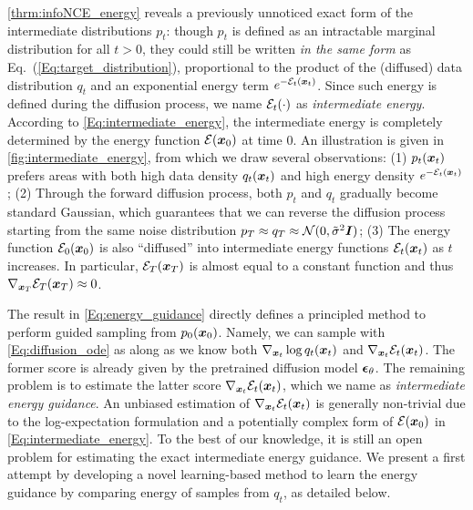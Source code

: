 \cref{thrm:infoNCE_energy} reveals a previously unnoticed exact form of the intermediate distributions $p_t$: though $p_t$ is defined as an intractable marginal distribution for all $t>0$, they could still be written \emph{in the same form} as  Eq.~(\ref{Eq:target_distribution}), proportional to the product of the (diffused) data distribution $q_t$ and an exponential energy term $e^{-{\mathcal{E}}_t({\bm{x}}_t)}$.
Since such energy is defined during the diffusion process, we name ${\mathcal{E}}_t(\cdot)$ as \textit{intermediate energy}.
According to \eqref{Eq:intermediate_energy}, the intermediate energy is completely determined by the energy function ${\mathcal{E}}({\bm{x}}_0)$ at time $0$.
An illustration is given in \cref{fig:intermediate_energy}, from which we draw several observations: (1) $p_t({\bm{x}}_t)$ prefers areas with both high data density $q_t({\bm{x}}_t)$ and high energy density $e^{-{\mathcal{E}}_t({\bm{x}}_t)}$; (2) Through the forward diffusion process, both $p_t$ and $q_t$ gradually become standard Gaussian, which guarantees that we can reverse the diffusion process starting from the same noise distribution $p_T \approx q_T \approx {\mathcal{N}}(0, \tilde\sigma^2{\bm{I}})$; (3) The energy function ${\mathcal{E}}_0({\bm{x}}_0)$ is also ``diffused'' into intermediate energy functions ${\mathcal{E}}_t({\bm{x}}_t)$ as $t$ increases. In particular, ${\mathcal{E}}_T({\bm{x}}_T)$ is almost equal to a constant function and thus $\nabla_{{\bm{x}}_T}{\mathcal{E}}_T({\bm{x}}_T) \approx 0$.
 

The result in \eqref{Eq:energy_guidance} directly defines a principled method to perform guided sampling from $p_0({\bm{x}}_0)$. 
Namely, we can sample with \eqref{Eq:diffusion_ode} as along as we know both $\nabla_{{\bm{x}}_t}\log q_t({\bm{x}}_t)$ and $\nabla_{{\bm{x}}_t}{\mathcal{E}}_t({\bm{x}}_t)$.
The former score is already given by the pretrained diffusion model $\bm{\epsilon}_\theta$. 
The remaining problem is to estimate the latter score $\nabla_{{\bm{x}}_t}{\mathcal{E}}_t({\bm{x}}_t)$, which we name as \emph{intermediate energy guidance}.
An unbiased estimation of $\nabla_{{\bm{x}}_t}{\mathcal{E}}_t({\bm{x}}_t)$ is generally non-trivial due to the log-expectation formulation and a potentially complex form of ${\mathcal{E}}({\bm{x}}_0)$ in \eqref{Eq:intermediate_energy}. To the best of our knowledge, it is still an open problem for estimating the exact intermediate energy guidance. 
We present a first attempt by developing a novel learning-based method to learn the energy guidance by comparing energy of samples from $q_t$, as detailed below.

















